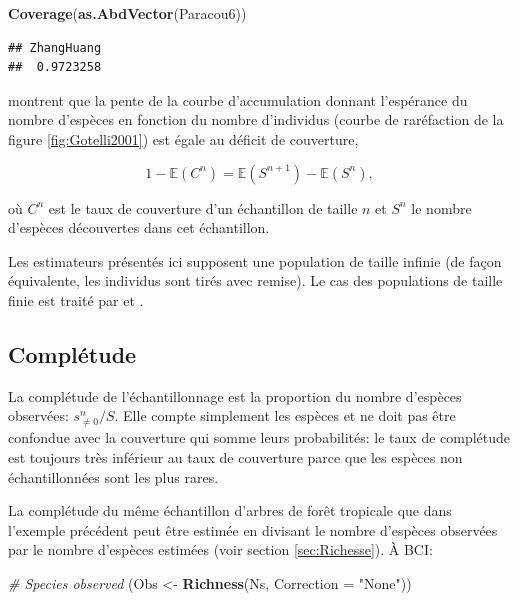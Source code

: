 \documentclass[
  11pt,
  french,
  a4paper,
  extrafontsizes,onecolumn,openright
  ]{memoir}
\newenvironment{Shaded}{\begin{snugshade}}{\end{snugshade}}
\newcommand{\CommentTok}[1]{\textcolor[rgb]{0.56,0.35,0.01}{\textit{#1}}}
\newcommand{\DataTypeTok}[1]{\textcolor[rgb]{0.13,0.29,0.53}{#1}}
\newcommand{\KeywordTok}[1]{\textcolor[rgb]{0.13,0.29,0.53}{\textbf{#1}}}
\newcommand{\NormalTok}[1]{#1}
\newcommand{\StringTok}[1]{\textcolor[rgb]{0.31,0.60,0.02}{#1}}
\begin{document}
\begin{Shaded}
\begin{Highlighting}[]
\KeywordTok{Coverage}\NormalTok{(}\KeywordTok{as.AbdVector}\NormalTok{(Paracou6))}
\end{Highlighting}
\end{Shaded}

\begin{verbatim}
## ZhangHuang 
##  0.9723258
\end{verbatim}

\normalsize

\textcite{Chao2012b} montrent que la pente de la courbe d'accumulation donnant l'espérance du nombre d'espèces en fonction du nombre d'individus (courbe de raréfaction de la figure \ref{fig:Gotelli2001}) est égale au déficit de couverture,

\begin{equation}
  \label{eq:DefC}
  1-{\mathbb E}\left(C^{n}\right)={\mathbb E}\left(S^{n+1}\right)-{\mathbb E}\left(S^{n}\right),
\end{equation}

où \(C^{n}\) est le taux de couverture d'un échantillon de taille \(n\) et \(S^{n}\) le nombre d'espèces découvertes dans cet échantillon.

Les estimateurs présentés ici supposent une population de taille infinie (de façon équivalente, les individus sont tirés avec remise).
Le cas des populations de taille finie est traité par \textcite{Chao2012} et \textcite{Hwang2014}.

\hypertarget{compluxe9tude}{%
\subsection{Complétude}\label{compluxe9tude}}

La complétude de l'échantillonnage est la proportion du nombre d'espèces observées: \(s^{n}_{\ne 0}/{S}\).
Elle compte simplement les espèces et ne doit pas être confondue avec la couverture qui somme leurs probabilités: le taux de complétude est toujours très inférieur au taux de couverture parce que les espèces non échantillonnées sont les plus rares.

La complétude du même échantillon d'arbres de forêt tropicale que dans l'exemple précédent peut être estimée en divisant le nombre d'espèces observées par le nombre d'espèces estimées (voir section \ref{sec:Richesse}).
À BCI:

\scriptsize

\begin{Shaded}
\begin{Highlighting}[]
\CommentTok{# Species observed}
\NormalTok{(Obs <-}\StringTok{ }\KeywordTok{Richness}\NormalTok{(Ns, }\DataTypeTok{Correction =} \StringTok{"None"}\NormalTok{))}
\end{Highlighting}
\end{Shaded}
\end{document}

